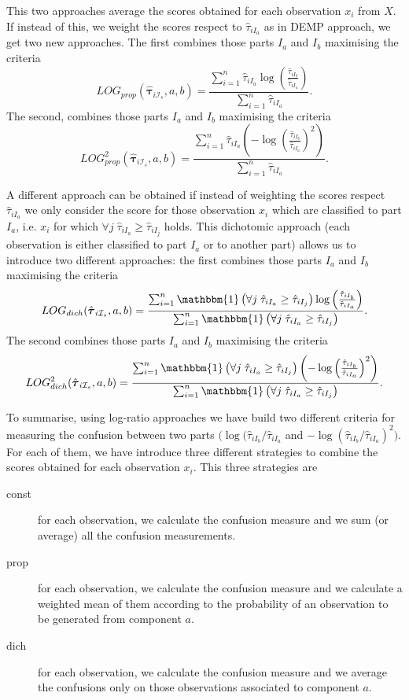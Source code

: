 \documentclass[10pt, a4paper]{article}
\newcommand{\m}[1]{\boldsymbol{#1}}
\begin{document}
This two approaches average the scores obtained for each observation $x_i$ from $X$. If instead of this, we weight the scores respect to $ \hat{\tau}_{iI_a}$  as in DEMP approach, we get two new approaches. The first combines those parts $I_a$ and $I_b$ maximising the criteria
\[
LOG_{prop}( \hat{\m \tau}_{i \mathcal{I}_s}, a, b) = \frac{ \sum_{i=1}^n \hat{\tau}_{iI_a} \log \left(\frac{ \hat{\tau}_{iI_b} }{ \hat{\tau}_{iI_a} }\right)}{\sum_{i=1}^n\hat{\tau}_{iI_a}}.
\]
The second, combines those parts $I_a$ and $I_b$ maximising the criteria
\[
LOG^2_{prop}( \hat{\m \tau}_{i \mathcal{I}_s}, a, b) = \frac{ \sum_{i=1}^n \hat{\tau}_{iI_a} \left(-\log \left(\frac{ \hat{\tau}_{iI_b} }{ \hat{\tau}_{iI_a} }\right)^2\right)}{\sum_{i=1}^n\hat{\tau}_{iI_a}}.
\]


A different approach can be obtained if instead of weighting the scores respect $ \hat{\tau}_{iI_a}$ we only consider the score for those observation $x_i$ which are classified to part $I_a$, i.e. $x_i$ for which $\forall j\; \hat{\tau}_{i I_{a}} \geq \hat{\tau}_{iI_j}$ holds. This dichotomic approach (each observation is either classified to part $I_a$ or to another part) allows us to introduce two different approaches: the first combines those parts $I_a$ and $I_b$ maximising the criteria
\[
LOG_{dich}( \hat{\m \tau}_{i \mathcal{I}_s}, a, b) = \frac{ \sum_{i=1}^n  \mathbbm{1}\left( \forall j\; \hat{\tau}_{i I_{a}} \geq \hat{\tau}_{iI_j} \right) \log \left(\frac{ \hat{\tau}_{iI_b} }{ \hat{\tau}_{iI_a} }\right)}{\sum_{i=1}^n \mathbbm{1}\left( \forall j\; \hat{\tau}_{i I_{a}} \geq \hat{\tau}_{iI_j} \right)}.
\]
The second combines those parts $I_a$ and $I_b$ maximising the criteria
\[
LOG^2_{dich}( \hat{\m \tau}_{i \mathcal{I}_s}, a, b) = \frac{ \sum_{i=1}^n \mathbbm{1}\left( \forall j\; \hat{\tau}_{i I_{a}} \geq \hat{\tau}_{iI_j} \right) \left(-\log \left(\frac{ \hat{\tau}_{iI_b} }{ \hat{\tau}_{iI_a} }\right)^2\right)}{\sum_{i=1}^n \mathbbm{1}\left( \forall j\; \hat{\tau}_{i I_{a}} \geq \hat{\tau}_{iI_j} \right)}.
\]

To summarise, using log-ratio approaches we have build two different criteria for measuring the confusion between two parts $(\log ( \hat{\tau}_{iI_b} / \hat{\tau}_{iI_a} $ and $-\log (\hat{\tau}_{iI_b} / \hat{\tau}_{iI_a} )^2)$. For each of them, we have introduce three different strategies to combine the scores obtained for each observation $x_i$. This three strategies are
\begin{description}
\item[const] for each observation, we calculate the confusion measure and we sum (or average) all the confusion measurements.
\item[prop] for each observation, we calculate the confusion measure and we calculate a weighted mean of them according to the probability of an observation to be generated from component $a$.
\item[dich] for each observation, we calculate the confusion measure and we average the confusions only on those observations associated to component $a$.
\end{description}
\end{document}
